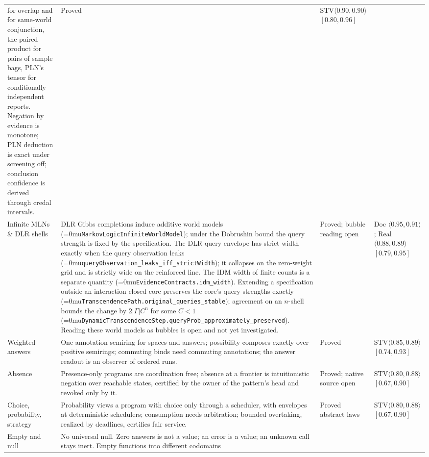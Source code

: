 \documentclass[11pt]{article}
\newcommand{\leanname}[1]{\textup{\Urlmuskip=0mu\relax\nolinkurl{#1}}}
\theoremstyle{definition}
\theoremstyle{remark}
\begin{document}
{\begin{longtable}{>{\raggedright\arraybackslash}p{2.3cm}
  >{\raggedright\arraybackslash}p{5.9cm}
  >{\raggedright\arraybackslash}p{2.3cm}
  >{\raggedright\arraybackslash}p{2.5cm}}
  for overlap and for same-world conjunction, the paired product for pairs of
  sample bags, PLN's tensor for conditionally independent reports. Negation by
  evidence is monotone; PLN deduction is exact under screening off;
  conclusion confidence is derived through credal intervals. & Proved
  & $\mathrm{STV}\langle 0.90, 0.90\rangle$ $[0.80,0.96]$\\
Infinite MLNs \& DLR shells & DLR Gibbs completions induce additive world models
  (\leanname{MarkovLogicInfiniteWorldModel}); under the Dobrushin bound the query
  strength is fixed by the specification. The DLR query envelope has strict
  width exactly when the query observation leaks
  (\leanname{queryObservation_leaks_iff_strictWidth}); it collapses on the
  zero-weight grid and is strictly wide on the reinforced line. The IDM width of
  finite counts is a separate quantity (\leanname{EvidenceContracts.idm_width}).
  Extending a specification outside an interaction-closed core preserves the
  core's query strengths exactly (\leanname{TranscendencePath.original_queries_stable});
  agreement on an $n$-shell bounds the change by $2|\Gamma|C^n$ for some $C<1$
  (\leanname{DynamicTranscendenceStep.queryProb_approximately_preserved}).
  Reading these world models as bubbles is open and not yet investigated.
  & Proved; bubble reading open & Doc $\langle 0.95, 0.91\rangle$; Real $\langle 0.88, 0.89\rangle$ $[0.79,0.95]$\\
Weighted answers & One annotation semiring for spaces and answers; possibility
  composes exactly over positive semirings; commuting binds need commuting
  annotations; the answer readout is an observer of ordered runs. & Proved &
  $\mathrm{STV}\langle 0.85, 0.89\rangle$ $[0.74,0.93]$\\
Absence & Presence-only programs are coordination free; absence at a frontier
  is intuitionistic negation over reachable states, certified by the owner of
  the pattern's head and revoked only by it. & Proved; native source open &
  $\mathrm{STV}\langle 0.80, 0.88\rangle$ $[0.67,0.90]$\\
Choice, probability, strategy & Probability views a program with choice only
  through a scheduler, with envelopes at deterministic schedulers;
  consumption needs arbitration; bounded overtaking, realized by deadlines,
  certifies fair service. & Proved abstract laws &
  $\mathrm{STV}\langle 0.80, 0.88\rangle$ $[0.67,0.90]$\\
Empty and null & No universal null. Zero answers is not a value; an error is a
  value; an unknown call stays inert. Empty functions into different codomains

\end{longtable}}
\end{document}
